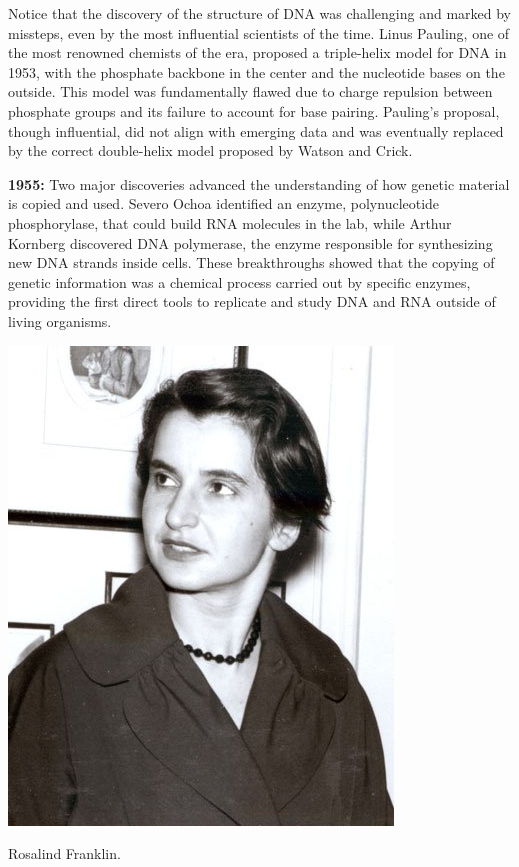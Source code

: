 Notice that the discovery of the structure of DNA was challenging and marked by missteps, even by the most influential scientists of the time. Linus Pauling, 
one of the most renowned chemists of the era, proposed a triple-helix model for DNA in 1953, with the phosphate backbone in the center and the nucleotide bases on the outside. This model was fundamentally flawed due to charge repulsion between phosphate groups and its failure to account for base pairing. Pauling’s proposal, though influential, did not align with emerging data and was eventually replaced by the correct double-helix model proposed by Watson and Crick.

\medskip\noindent\textbf{1955:} Two major discoveries advanced the understanding of how genetic material is copied and used. Severo Ochoa identified an enzyme, polynucleotide phosphorylase, that could build RNA molecules in the lab, while Arthur Kornberg discovered DNA polymerase, the enzyme responsible for synthesizing new DNA strands inside cells. These breakthroughs showed that the copying of genetic information was a chemical process carried out by specific enzymes, providing the first direct tools to replicate and study DNA and RNA outside of living organisms.

\begin{marginfigure}
    \includegraphics{figs/history/rosalind-franklin.jpeg}
    \caption[6pt]{Rosalind Franklin.}
    \label{fig:franklin}
\end{marginfigure}

